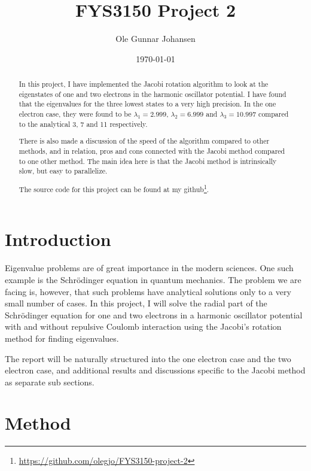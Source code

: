 \documentclass[11pt, a4paper]{article}
\title{FYS3150 Project 2}
\date{\today}
\author{Ole Gunnar Johansen}
\newcommand{\SL}{Schr\"{o}dinger }
\begin{document}
	\maketitle
	
	\begin{abstract}
		In this project, I have implemented the Jacobi rotation algorithm to look at the eigenstates of one and two electrons in the harmonic oscillator potential. I have found that the eigenvalues for the three lowest states to a very high precision. In the one electron case, they were found to be $\lambda_1 = 2.999$, $\lambda_2 = 6.999$ and $\lambda_3 = 10.997$ compared to the analytical 3, 7 and 11 respectively.
		
		There is also made a discussion of the speed of the algorithm compared to other methods, and in relation, pros and cons connected with the Jacobi method compared to one other method. The main idea here is that the Jacobi method is intrinsically  slow, but easy to parallelize. 
		
		The source code for this project can be found at my github\footnote{\url{https://github.com/olegjo/FYS3150-project-2}}.
	\end{abstract}
	
	\section{Introduction}
		Eigenvalue problems are of great importance in the modern sciences. One such example is the \SL equation in quantum mechanics. The problem we are facing is, however, that such problems have analytical solutions only to a very small number of cases. In this project, I will solve the radial part of the \SL equation for one and two electrons in a harmonic oscillator potential with and without repulsive Coulomb interaction using the Jacobi's rotation method for finding eigenvalues.
		
		The report will be naturally structured into the one electron case and the two electron case, and additional results and discussions specific to the Jacobi method as separate sub sections.

	
	\section{Method}
\end{document}
